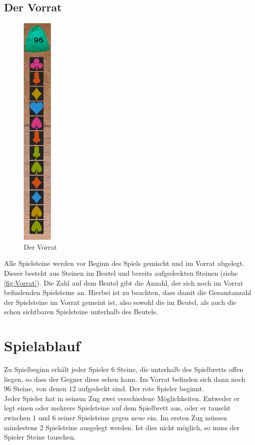 \documentclass[a4paper, ngerman]{scrartcl}
\begin{document}
\subsection{Der Vorrat}
\begin{figure}
	\centering
	\includegraphics[scale = 0.5]{images/Vorratsbeutel}
	\caption{Der Vorrat}
	\label{fig:Vorrat}
\end{figure}
 Alle Spielsteine werden vor Beginn des Spiels gemischt und im Vorrat abgelegt. Dieser besteht aus Steinen im Beutel und bereits aufgedeckten Steinen (siehe \autoref{fig:Vorrat}). Die Zahl auf dem Beutel gibt die Anzahl, der sich noch im Vorrat befindenden Spielsteine an. Hierbei ist zu beachten, dass damit die Gesamtanzahl der Spielsteine im Vorrat gemeint ist, also sowohl die im Beutel, als auch die schon sichtbaren Spielsteine unterhalb des Beutels.\\

\section{Spielablauf}
	Zu Spielbeginn erhält jeder Spieler 6 Steine, die unterhalb des Spielbretts offen liegen, so dass der Gegner diese sehen kann. Im Vorrat befinden sich dann noch 96 Steine, von denen 12 aufgedeckt sind. Der rote Spieler beginnt.\\
 Jeder Spieler hat in seinem Zug zwei verschiedene Möglichkeiten. Entweder er legt einen oder mehrere Spielsteine auf dem Spielbrett aus, oder er tauscht zwischen 1 und 6 seiner Spielsteine gegen neue ein. Im ersten Zug müssen mindestens 2 Spielsteine ausgelegt werden. Ist dies nicht möglich, so muss der Spieler Steine tauschen.
 \newpage
	
\end{document}
